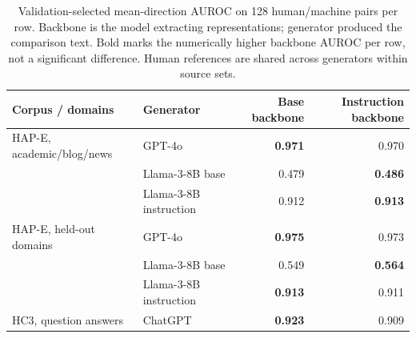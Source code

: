 \begin{table}[t]
\centering\small
\caption{Validation-selected mean-direction AUROC on 128 human/machine pairs per row. Backbone is the model extracting representations; generator produced the comparison text. Bold marks the numerically higher backbone AUROC per row, not a significant difference. Human references are shared across generators within source sets.}\label{tab:transfer}
\begin{tabular}{@{}llrr@{}}
\toprule
Corpus / domains & Generator & Base backbone & Instruction backbone\\
\midrule
\textsc{HAP-E}, academic/blog/news & GPT-4o & \textbf{0.971} & 0.970\\
& Llama-3-8B base & 0.479 & \textbf{0.486}\\
& Llama-3-8B instruction & 0.912 & \textbf{0.913}\\
\textsc{HAP-E}, held-out domains & GPT-4o & \textbf{0.975} & 0.973\\
& Llama-3-8B base & 0.549 & \textbf{0.564}\\
& Llama-3-8B instruction & \textbf{0.913} & 0.911\\
\textsc{HC3}, question answers & ChatGPT & \textbf{0.923} & 0.909\\
\bottomrule
\end{tabular}
\end{table}
